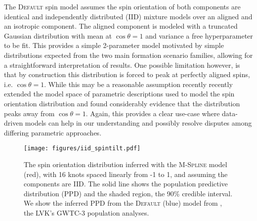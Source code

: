 The \textsc{Default} spin model assumes the spin orientation of both components are identical and independently distributed (IID) mixture models over an
aligned and an isotropic component. The aligned component is modeled with a truncated Gaussian distribution with mean at $\cos{\theta}=1$ and variance a free 
hyperparameter to be fit. This provides a simple 2-parameter model motivated by simple distributions expected from the two main formation scenario families, allowing 
for a straightforward interpretation of results. One possible limitation however, is that by construction this distribution is forced to peak at perfectly aligned spins, 
i.e. $\cos{\theta}=1$. While this may be a reasonable assumption recently \citet{spinitasyoulike} recently extended the model space of parametric descriptions 
used to model the spin orientation distribution and found considerably evidence that the distribution peaks away from $\cos{\theta}=1$. Again, this provides a clear 
use-case where data-driven models can help in our understanding and possibly resolve disputes among differing parametric approaches.

\begin{figure}
    \begin{centering}
        \texttt{[image: figures/iid\_spintilt.pdf]}
        \caption{The spin orientation distribution inferred with the \textsc{M-Spline} model (red), with 16 knots spaced linearly from -1 to 1, and 
        assuming the components are IID. The solid line shows the population predictive distribution (PPD) and the shaded region, the 90\% credible interval. 
        We show the inferred PPD from the \textsc{Default} (blue) model from \citet{o3b_astro_dist}, the LVK's GWTC-3 population analyses.}
        \label{fig:iid_spintilt_dist}
    \end{centering}
\end{figure}

